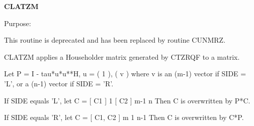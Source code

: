 {\bfseries C\+L\+A\+T\+Z\+M} 

 \begin{DoxyParagraph}{Purpose\+: }
\begin{DoxyVerb} This routine is deprecated and has been replaced by routine CUNMRZ.

 CLATZM applies a Householder matrix generated by CTZRQF to a matrix.

 Let P = I - tau*u*u**H,   u = ( 1 ),
                               ( v )
 where v is an (m-1) vector if SIDE = 'L', or a (n-1) vector if
 SIDE = 'R'.

 If SIDE equals 'L', let
        C = [ C1 ] 1
            [ C2 ] m-1
              n
 Then C is overwritten by P*C.

 If SIDE equals 'R', let
        C = [ C1, C2 ] m
               1  n-1
 Then C is overwritten by C*P.\end{DoxyVerb}
 
\end{DoxyParagraph}

